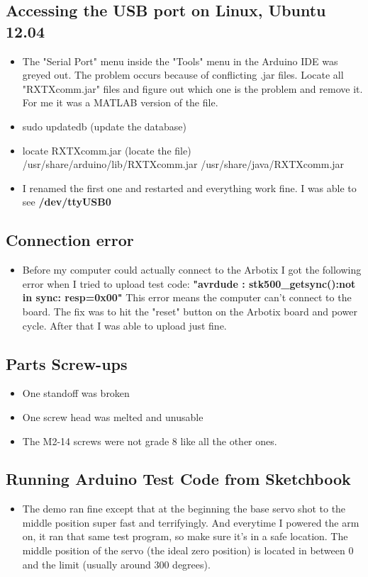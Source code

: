 \documentclass[letterpaper, 10 pt]{article}
\begin{document}
  \subsection{Accessing the USB port on Linux, Ubuntu 12.04}
    \begin{itemize}
      \item The "Serial Port" menu inside the "Tools" menu in the Arduino IDE was greyed out. The problem occurs because of conflicting .jar files. Locate all "RXTXcomm.jar" files and figure out which one is the problem and remove it. For me it was a MATLAB version of the file.
      \item sudo updatedb (update the database)
      \item locate RXTXcomm.jar (locate the file) \newline
      /usr/share/arduino/lib/RXTXcomm.jar \newline
      /usr/share/java/RXTXcomm.jar
      \item I renamed the first one and restarted and everything work fine. I was able to see \textbf{/dev/ttyUSB0}
    \end{itemize}
  \subsection{Connection error}
    \begin{itemize}
      \item Before my computer could actually connect to the Arbotix I got the following error when I tried to upload test code: \textbf{"avrdude : stk500\_getsync():not in sync: resp=0x00"} \newline
      This error means the computer can't connect to the board. The fix was to hit the "reset" button on the Arbotix board and power cycle. After that I was able to upload just fine.
    \end{itemize}
  \subsection{Parts Screw-ups}
    \begin{itemize}
      \item One standoff was broken
      \item One screw head was melted and unusable
      \item The M2-14 screws were not grade 8 like all the other ones.
    \end{itemize}
  \subsection{Running Arduino Test Code from Sketchbook}
    \begin{itemize}
      \item The demo ran fine except that at the beginning the base servo shot to the middle position super fast and terrifyingly. And everytime I powered the arm on, it ran that same test program, so make sure it's in a safe location. The middle position of the servo (the ideal zero position) is located in between 0 and the limit (usually around 300 degrees).
    \end{itemize}
\end{document}
